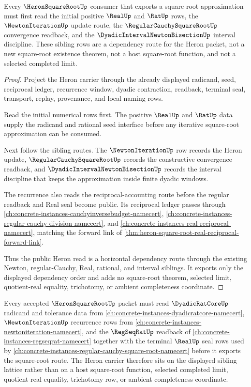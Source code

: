 \begin{theorem}
\label{thm:heron-square-root-sibling-dependency-route}
Every $\HeronSquareRootUp$ consumer that exports a square-root approximation must first read the initial positive $\RealUp$ and $\RatUp$ rows, the $\NewtonIterationUp$ update route, the $\RegularCauchySquareRootUp$ convergence readback, and the $\DyadicIntervalNewtonBisectionUp$ interval discipline. These sibling rows are a dependency route for the Heron packet, not a new square-root existence theorem, not a host square-root function, and not a selected completed limit.
\end{theorem}
\begin{proof}
Project the Heron carrier through the already displayed radicand, seed, reciprocal ledger, recurrence window, dyadic contraction, readback, terminal seal, transport, replay, provenance, and local naming rows.

Read the initial numerical rows first. The positive $\RealUp$ and $\RatUp$ data supply the radicand and rational seed interface before any iterative square-root approximation can be consumed.

Next follow the sibling routes. The $\NewtonIterationUp$ row records the Heron update, $\RegularCauchySquareRootUp$ records the constructive convergence readback, and $\DyadicIntervalNewtonBisectionUp$ records the interval discipline that keeps the approximation inside finite dyadic windows.

The recurrence also reads the reciprocal-accounting route before the regular readback and Real seal become public. Its reciprocal ledger passes through \autoref{ch:concrete-instances-cauchyinversebudget-namecert}, \autoref{ch:concrete-instances-regular-cauchy-division-namecert}, and \autoref{ch:concrete-instances-real-reciprocal-namecert}, matching the forward link of \autoref{thm:heron-square-root-real-reciprocal-forward-link}.

Thus the public Heron read is a horizontal dependency route through the existing Newton, regular-Cauchy, Real, rational, and interval siblings. It exports only the displayed dependency order and adds no square-root theorem, selected limit, quotient-real equality, trichotomy, or ambient completeness coordinate.
\end{proof}

\begin{theorem}
\label{thm:heron-square-root-sibling-route}
Every accepted $\HeronSquareRootUp$ packet must read $\DyadicRatCoreUp$ radicand and tolerance data from \autoref{ch:concrete-instances-dyadicratcore-namecert}, $\NewtonIterationUp$ recurrence rows from \autoref{ch:concrete-instances-newtoniteration-namecert}, and the $\RegSeqRatUp$ readback of \autoref{ch:concrete-instances-regseqrat-namecert} together with the terminal $\RealUp$ seal rows used by \autoref{ch:concrete-instances-regular-cauchy-square-root-namecert} before it exports the square-root route. The Heron carrier therefore sits on the displayed sibling lattice rather than on a host square-root function, selected completed limit, quotient-real equality, trichotomy row, or ambient completeness coordinate.
\end{theorem}
